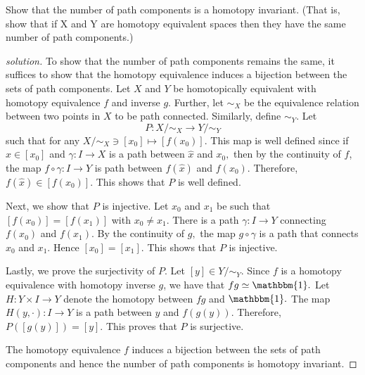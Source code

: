 \documentclass{article}
\newcommand{\1}{\mathbbm{1}}
\newenvironment{problem}[2][Problem]{\begin{trivlist}
\item[\hskip \labelsep {\bfseries #1}\hskip \labelsep {\bfseries #2.}]}{\end{trivlist}}
\begin{document}
\begin{problem}{4}
    Show that the number of path components is a homotopy invariant. (That is, show that if X and Y are homotopy equivalent spaces then they have the same number of path components.)
\end{problem}
\begin{proof}[solution]
    To show that the number of path components remains the same, it suffices to show that the homotopy equivalence induces a bijection between the sets of path components. Let $X$ and $Y$ be homotopically equivalent with homotopy equivalence $f$ and inverse $g.$ Further, let $\mathord{\sim}_X$ be the equivalence relation between two points in $X$ to be path connected. Similarly, define $\mathord\sim_Y.$ Let 
    \[
        P: X / \mathord\sim_X \longrightarrow Y / \mathord\sim_Y 
    \]
    such that for any $X / \mathord\sim_X \ni [x_0] \mapsto [f(x_0)].$ This map is well defined since if $\hat{x} \in [x_0]$ and $\gamma : I \longrightarrow X$ is a path between $\hat{x}$ and $x_0,$ then by the continuity of $f$, the map $f \circ \gamma : I \longrightarrow Y$ is path between $f(\hat{x})$ and $f(x_0).$ Therefore, $f(\hat{x}) \in [f(x_0)].$ This shows that $P$ is well defined.
    
    Next, we show that $P$ is injective. Let $x_0$ and $x_1$ be such that $[f(x_0)] = [f(x_1)]$ with $x_0 \neq x_1.$  There is a path $\gamma : I \longrightarrow Y$ connecting $f(x_0)$ and $f(x_1).$ By the continuity of $g,$ the map $g \circ \gamma$ is a path that connects $x_0$ and $x_1.$ Hence $[x_0] = [x_1].$ This shows that $P$ is injective.

    Lastly, we prove the surjectivity of $P.$ Let $[y] \in Y / \mathord\sim_Y.$ Since $f$ is a homotopy equivalence with homotopy inverse $g$, we have that $fg \simeq \1.$ Let $H:Y \times I \longrightarrow Y$ denote the homotopy between $fg$ and $\1.$ The map $H(y, \cdot) : I \longrightarrow Y$ is a path between $y$ and $f(g(y)).$ Therefore, $P([g(y)]) = [y].$ This proves that $P$ is surjective.
    
    The homotopy equivalence $f$ induces a bijection between the sets of path components and hence the number of path components is homotopy invariant.
\end{proof}
\end{document}
